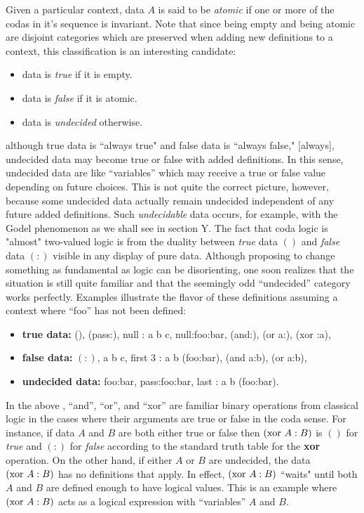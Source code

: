\documentclass[11pt]{article}
\begin{document}
     Given a particular context, data $A$ is said to be {\it atomic} if one or more of the codas in it's sequence is invariant.  Note that since being empty and being atomic 
are disjoint categories which are preserved when adding new definitions to a context, this classification is an interesting candidate: 
\begin{itemize}
\item data is {\it true} if it is empty.
\item data is {\it false} if it is atomic.
\item data is {\it undecided} otherwise.
\end{itemize}
although true data is ``always true" and false data is ``always false," [always], undecided data may become true or false with added 
definitions.  In this sense, undecided data are like ``variables'' which may receive a true or false value depending on future choices.  
This is not quite the correct picture, however, because some undecided data actually remain undecided independent of any future added definitions.  
Such {\it undecidable} data occurs, for example, with the Godel phenomenon as we shall see in section Y.  
The fact that coda logic is "almost" two-valued logic is from the duality between {\it true} data $()$  and {\it false} data $(:)$ visible in any display of pure data.  
Although proposing to change something as fundamental as logic can be disorienting, one soon realizes that the situation is still quite familiar and that the 
seemingly odd ``undecided'' category works perfectly.  
Examples illustrate the flavor of these definitions assuming a context where ``foo'' has not been defined: 
\begin{itemize}
\item[] {\bf true data:} (), (pass:), null : a b c, null:foo:bar, (and:), (or a:), (xor :a),
\item[] {\bf false data:} $(:)$, a b c, first 3 : a b (foo:bar), (and a:b), (or a:b),
\item[] {\bf undecided data:}  foo:bar, pass:foo:bar, last : a b (foo:bar).
\end{itemize}
In the above , ``and'', ``or'', and ``xor'' are familiar binary operations from classical logic in the cases where their arguments are true or false in the coda sense. 
For instance, if data $A$ and $B$ are both either true or false then $({\rm xor}\ A:B)$ is $()$ for {\it true} and $(:)$ for {\it false} according to the standard truth
 table for the {\bf xor} operation.  On the other hand, if either $A$ or $B$ are 
undecided, the data $({\rm xor}\ A:B)$ has no definitions that apply.  In effect, $({\rm xor}\ A:B)$ ``waits" until both $A$ and $B$ are defined enough to have logical values.   
This is an example where $({\rm xor}\ A:B)$ acts as a logical expression with ``variables'' $A$ and $B$. 
\end{document}
